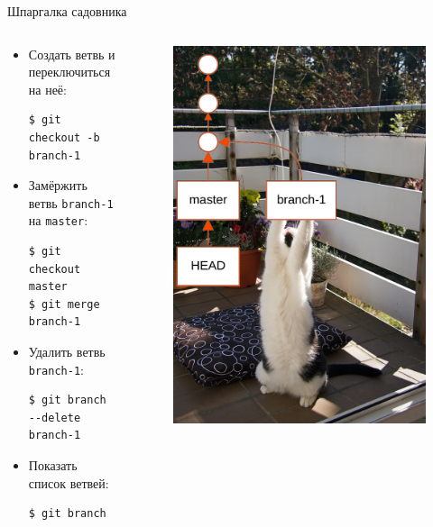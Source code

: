 \documentclass[presentation]{beamer}
\begin{document}
\begin{frame}[fragile]{Шпаргалка садовника}
  \begin{columns}
    \begin{column}{.6\textwidth}
      \begin{itemize}
      \item Создать ветвь и переключиться на неё:
\begin{verbatim}
$ git checkout -b branch-1
\end{verbatim}
      \item Замёржить ветвь \texttt{branch-1} на \texttt{master}:
\begin{verbatim}
$ git checkout master
$ git merge branch-1
\end{verbatim}
      \item Удалить ветвь \texttt{branch-1}:
\begin{verbatim}
$ git branch --delete branch-1
\end{verbatim}
      \item Показать список ветвей:
\begin{verbatim}
$ git branch
\end{verbatim}
      \end{itemize}
    \end{column}
    \begin{column}{.4\textwidth}
      \begin{figure}[htb]
        \centering
        \includegraphics[height=.8\textheight]{cat-gitbranching}

\end{figure}
\end{column}
\end{columns}
\end{frame}
\end{document}
